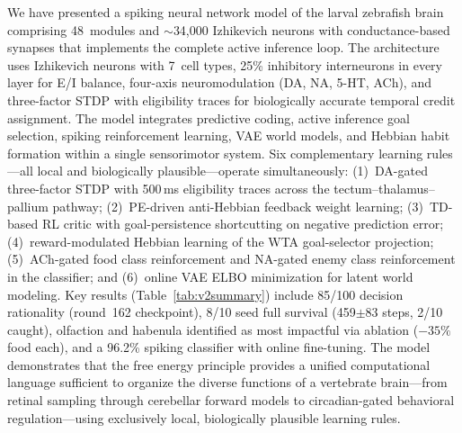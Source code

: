 \documentclass[12pt]{article}
\begin{document}
We have presented a spiking neural network model of the larval
zebrafish brain comprising 48~modules and $\sim$34,000 Izhikevich neurons
with conductance-based synapses that implements the complete active
inference loop.
The architecture uses Izhikevich neurons with 7~cell types,
25\% inhibitory interneurons in every layer for E/I balance,
four-axis neuromodulation (DA, NA, 5-HT, ACh), and three-factor STDP
with eligibility traces for biologically accurate temporal credit
assignment.
The model integrates predictive coding, active inference goal
selection, spiking reinforcement learning, VAE world models, and
Hebbian habit formation within a single sensorimotor system.
Six complementary learning rules---all local and biologically
plausible---operate simultaneously: (1)~DA-gated three-factor STDP
with 500\,ms eligibility traces across the tectum--thalamus--pallium
pathway; (2)~PE-driven anti-Hebbian feedback weight learning;
(3)~TD-based RL critic with goal-persistence shortcutting on
negative prediction error; (4)~reward-modulated Hebbian learning of
the WTA goal-selector projection; (5)~ACh-gated food class
reinforcement and NA-gated enemy class reinforcement in the
classifier; and (6)~online VAE ELBO minimization for latent world
modeling.
Key results (Table~\ref{tab:v2summary}) include 85/100 decision
rationality (round~162 checkpoint), 8/10 seed full survival
(459$\pm$83 steps, 2/10 caught), olfaction and habenula
identified as most impactful via ablation ($-35\%$ food each), and
a 96.2\% spiking classifier with online fine-tuning.
The model demonstrates that the free energy principle provides a
unified computational language sufficient to organize the diverse
functions of a vertebrate brain---from retinal sampling through
cerebellar forward models to circadian-gated behavioral regulation---using
exclusively local, biologically plausible learning rules.
\end{document}
